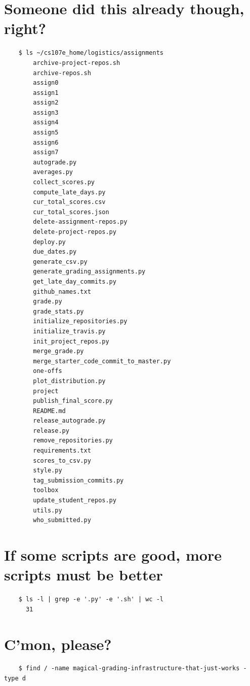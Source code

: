 \documentclass{article}
\begin{document}
\section*{Someone did this already though, right?}
\vspace{2ex}
\begin{verbatim}
    $ ls ~/cs107e_home/logistics/assignments
        archive-project-repos.sh
        archive-repos.sh
        assign0
        assign1
        assign2
        assign3
        assign4
        assign5
        assign6
        assign7
        autograde.py
        averages.py
        collect_scores.py
        compute_late_days.py
        cur_total_scores.csv
        cur_total_scores.json
        delete-assignment-repos.py
        delete-project-repos.py
        deploy.py
        due_dates.py
        generate_csv.py
        generate_grading_assignments.py
        get_late_day_commits.py
        github_names.txt
        grade.py
        grade_stats.py
        initialize_repositories.py
        initialize_travis.py
        init_project_repos.py
        merge_grade.py
        merge_starter_code_commit_to_master.py
        one-offs
        plot_distribution.py
        project
        publish_final_score.py
        README.md
        release_autograde.py
        release.py
        remove_repositories.py
        requirements.txt
        scores_to_csv.py
        style.py
        tag_submission_commits.py
        toolbox
        update_student_repos.py
        utils.py
        who_submitted.py
\end{verbatim}

\newpage

\section*{If some scripts are good, more scripts must be better}
\vspace{2ex}
\begin{verbatim}
    $ ls -l | grep -e '.py' -e '.sh' | wc -l
      31
\end{verbatim}

\newpage

\section*{C'mon, please?}
\vspace{2ex}
\begin{verbatim}
    $ find / -name magical-grading-infrastructure-that-just-works -type d    
\end{verbatim}
\end{document}
